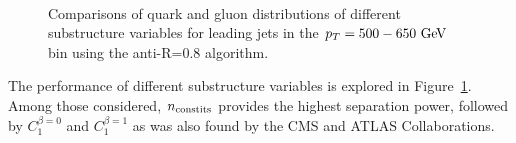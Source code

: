 \begin{figure}
\begin{center}
\\
\caption{Comparisons of quark and gluon distributions of different substructure variables for leading jets in the 
$\pt=500-650 \GeV$ bin using the anti-\kT R=0.8 algorithm. }
\label{fig:qg_pt500_subst_AKt_R08}
\end{center}
\end{figure}

The performance of different substructure variables is explored in Figure~\ref{fig:qg_pt500_subst_AKt_R08}. Among those considered, $n_{\rm constits}$ provides the highest separation
power, followed by $C_1^{\beta=0}$ and $C_1^{\beta=1}$ as was also found by the CMS and ATLAS Collaborations.

